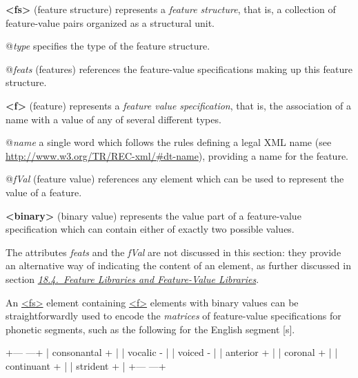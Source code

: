 \begin{sansreflist}
  
\item [\textbf{<fs>}] (feature structure) represents a \textit{feature structure}, that is, a collection of feature-value pairs organized as a structural unit.\hfil\\[-10pt]\begin{sansreflist}
    \item[@{\itshape type}]
  specifies the type of the feature structure.
    \item[@{\itshape feats}]
  (features) references the feature-value specifications making up this feature structure.
\end{sansreflist}  
\item [\textbf{<f>}] (feature) represents a \textit{feature value specification}, that is, the association of a name with a value of any of several different types.\hfil\\[-10pt]\begin{sansreflist}
    \item[@{\itshape name}]
  a single word which follows the rules defining a legal XML name (see \url{http://www.w3.org/TR/REC-xml/\#dt-name}), providing a name for the feature.
    \item[@{\itshape fVal}]
  (feature value) references any element which can be used to represent the value of a feature.
\end{sansreflist}  
\item [\textbf{<binary>}] (binary value) represents the value part of a feature-value specification which can contain either of exactly two possible values.
\end{sansreflist}
 The attributes {\itshape feats} and the {\itshape fVal} are not discussed in this section: they provide an alternative way of indicating the content of an element, as further discussed in section \textit{\hyperref[FSFL]{18.4.\ Feature Libraries and Feature-Value Libraries}}.\par
An \hyperref[TEI.fs]{<fs>} element containing \hyperref[TEI.f]{<f>} elements with binary values can be straightforwardly used to encode the \textit{matrices} of feature-value specifications for phonetic segments, such as the following for the English segment [s]. \par\hfill\bgroup\exampleFont\vskip 10pt\begin{shaded}
\obeyspaces +--- ---+ | consonantal + | | vocalic - | | voiced - | | anterior + | | coronal + | | continuant + | | strident + | +--- ---+\end{shaded}
